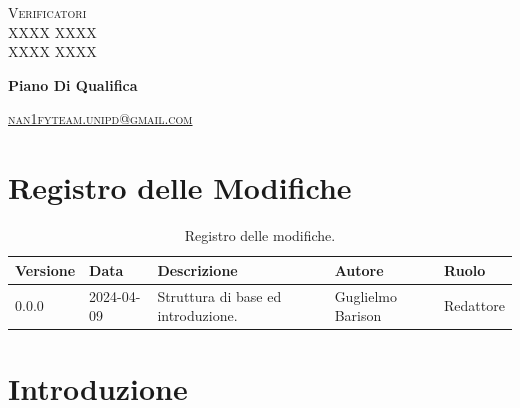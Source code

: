 \documentclass[8pt]{article}
\begin{document}
\begin{titlepage}
\begin{minipage}[t]{0.47\textwidth}
		{\large{\textsc{Verificatori}}
			\vspace{3mm}
			{\\\large{\textsc{XXXX XXXX}\\}} 
			{\large{\textsc{XXXX XXXX}}}
			
		}
		\vspace{4mm}\vspace{4mm}
	\end{minipage}
	\vspace{4cm}
	\begin{center}
		\begin{flushright}
			{\fontsize{30pt}{52pt}\selectfont \textbf{Piano Di Qualifica}} %
		\end{flushright}
		\vspace{3cm}
	\end{center}
	\vspace{10 cm}
	{\small \textsc{\href{mailto: nan1fyteam.unipd@gmail.com}{nan1fyteam.unipd@gmail.com}}}
\end{titlepage}
\pagestyle{mystyle}
\section*{Registro delle Modifiche}
\begin{table}[ht!]	
	\centering
	\begin{tabular}{p{1.2cm} p{2cm} p{6cm} p{3cm} p{2cm}}
		\toprule
		\textbf{Versione}& \textbf{Data} & \textbf{Descrizione} & \textbf{Autore} & \textbf{Ruolo} \\
		\midrule
		0.0.0 & 2024-04-09 & Struttura di base ed introduzione.  & Guglielmo Barison & Redattore \\
		\bottomrule
	\end{tabular}
	\caption{Registro delle modifiche.}
	\label{table:Registro delle modifiche}
\end{table}
\newpage
\tableofcontents
\newpage
\listoffigures
\newpage
\listoftables
\newpage
\justifying
\section{Introduzione}
\end{document}
